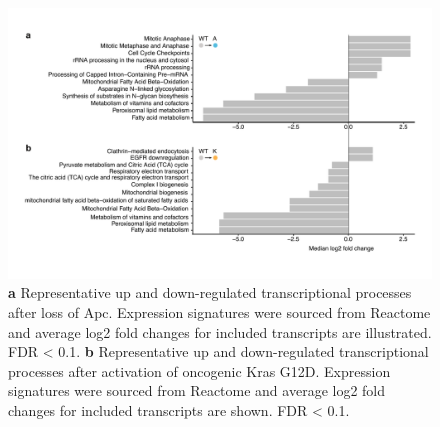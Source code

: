 \begin{flushleft}
 \begin{figure}[h]
\centering
\includegraphics[width=\textwidth,
                height=\textheight,
                keepaspectratio]{figures/adenomaprofiling/pdf/fig_1_6_2.pdf}
\caption{
\textbf{a} Representative up and down-regulated transcriptional processes after loss of Apc. Expression signatures were sourced from Reactome and average log2 fold changes for included transcripts are illustrated. FDR < 0.1.
\textbf{b} Representative up and down-regulated transcriptional processes after activation of oncogenic Kras G12D. Expression signatures were sourced from Reactome and average log2 fold changes for included transcripts are shown. FDR < 0.1.
}
\label{fig_162}
\end{figure}
\bigbreak




\end{flushleft}
